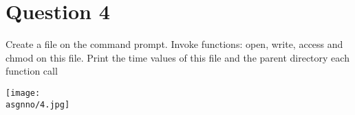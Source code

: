 \documentclass[main.tex]{subfiles}
\begin{document}
\section{Question 4}

Create a file on the command prompt. Invoke functions: open, write, access and
chmod on this file. Print the time values of this file and the parent directory
each function call


\centering\texttt{[image: \\asgnno/4.jpg]}
\end{document}
